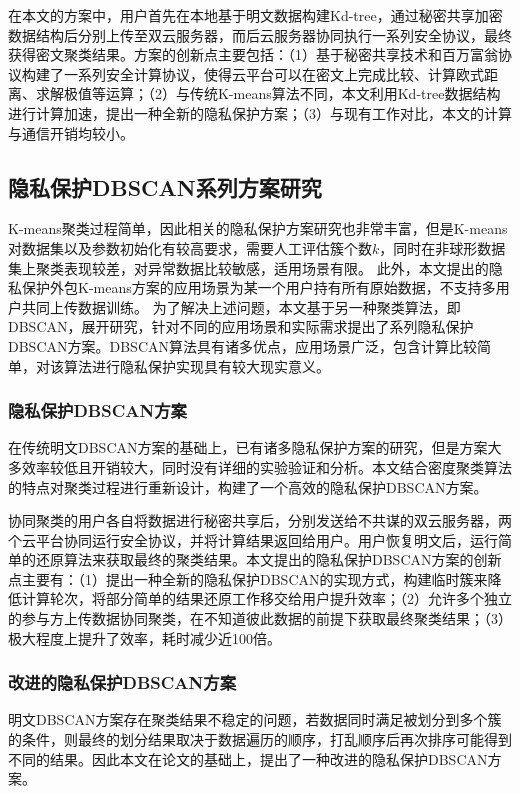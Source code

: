 在本文的方案中，用户首先在本地基于明文数据构建Kd-tree，通过秘密共享加密数据结构后分别上传至双云服务器，而后云服务器协同执行一系列安全协议，最终获得密文聚类结果。方案的创新点主要包括：（1）基于秘密共享技术和百万富翁协议\cite{rathee2020cryptflow2}构建了一系列安全计算协议，使得云平台可以在密文上完成比较、计算欧式距离、求解极值等运算；（2）与传统K-means算法不同，本文利用Kd-tree数据结构进行计算加速，提出一种全新的隐私保护方案；（3）与现有工作对比，本文的计算与通信开销均较小。

\subsection{隐私保护DBSCAN系列方案研究}
K-means聚类过程简单，因此相关的隐私保护方案研究也非常丰富，但是K-means对数据集以及参数初始化有较高要求，需要人工评估簇个数$ k $，同时在非球形数据集上聚类表现较差，对异常数据比较敏感，适用场景有限。
此外，本文提出的隐私保护外包K-means方案的应用场景为某一个用户持有所有原始数据，不支持多用户共同上传数据训练。
为了解决上述问题，本文基于另一种聚类算法，即DBSCAN，展开研究，针对不同的应用场景和实际需求提出了系列隐私保护DBSCAN方案。DBSCAN算法具有诸多优点，应用场景广泛，包含计算比较简单，对该算法进行隐私保护实现具有较大现实意义。

\subsubsection{隐私保护DBSCAN方案}
\label{fanganyi}
在传统明文DBSCAN方案\cite{1996A}的基础上，已有诸多隐私保护方案的研究\cite{2006Privacy,2021Privacy}，但是方案大多效率较低且开销较大，同时没有详细的实验验证和分析。本文结合密度聚类算法的特点对聚类过程进行重新设计，构建了一个高效的隐私保护DBSCAN方案。

协同聚类的用户各自将数据进行秘密共享后，分别发送给不共谋的双云服务器，两个云平台协同运行安全协议，并将计算结果返回给用户。用户恢复明文后，运行简单的还原算法来获取最终的聚类结果。本文提出的隐私保护DBSCAN方案的创新点主要有：（1）提出一种全新的隐私保护DBSCAN的实现方式，构建临时簇来降低计算轮次，将部分简单的结果还原工作移交给用户提升效率；（2）允许多个独立的参与方上传数据协同聚类，在不知道彼此数据的前提下获取最终聚类结果；（3）极大程度上提升了效率，耗时减少近100倍。
\subsubsection{改进的隐私保护DBSCAN方案}
明文DBSCAN方案存在聚类结果不稳定的问题，若数据同时满足被划分到多个簇的条件，则最终的划分结果取决于数据遍历的顺序，打乱顺序后再次排序可能得到不同的结果。因此本文在论文\cite{tran2013revised}的基础上，提出了一种改进的隐私保护DBSCAN方案。

